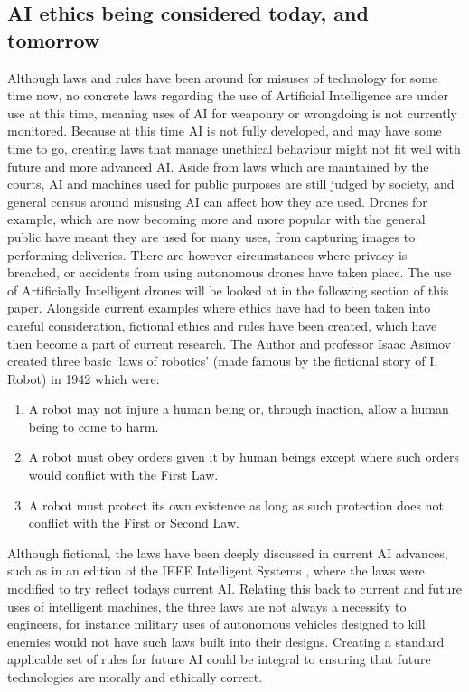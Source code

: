 \documentclass[article]{IEEEtran}
\begin{document}
\subsection{AI ethics being considered today, and tomorrow}
Although laws and rules have been around for misuses of technology for some time now, no concrete laws regarding the use of Artificial Intelligence are under use at this time, meaning uses of AI for weaponry or wrongdoing is not currently monitored. Because at this time AI is not fully developed, and may have some time to go, creating laws that manage unethical behaviour might not fit well with future and more advanced AI. 
Aside from laws which are maintained by the courts, AI and machines used for public purposes are still judged by society, and general census around misusing AI can affect how they are used. Drones for example, which are now becoming more and more popular with the general public have meant they are used for many uses, from capturing images to performing deliveries. There are however circumstances where privacy is breached, or accidents from using autonomous drones have taken place. The use of Artificially Intelligent drones will be looked at in the following section of this paper.
Alongside current examples where ethics have had to been taken into careful consideration, fictional ethics and rules have been created, which have then become a part of current research. The Author and professor Isaac Asimov created three basic ‘laws of robotics’ (made famous by the fictional story of I, Robot) in \cite{laws} 1942 which were:
\begin{enumerate}
\item A robot may not injure a human being or, through inaction, allow a human being to come to harm.
\item A robot must obey orders given it by human beings except where such orders would conflict with the First Law.
\item A robot must protect its own existence as long as such protection does not conflict with the First or Second Law. 
\end{enumerate}
Although fictional, the laws have been deeply discussed in current AI advances, such as in an edition of the IEEE Intelligent Systems \cite{ieeRobots}, where the laws were modified to try reflect todays current AI. Relating this back to current and future uses of intelligent machines, the three laws are not always a necessity to engineers, for instance military uses of autonomous vehicles designed to kill enemies would not have such laws built into their designs. 
Creating a standard applicable set of rules for future AI could be integral to ensuring that future technologies are morally and ethically correct.
\end{document}
